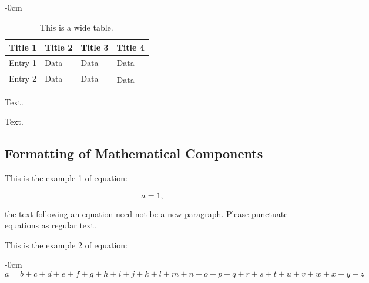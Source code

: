 \begin{table}[H]
	\caption{This is a wide table.\label{tab2}}
	\begin{adjustwidth}{-\extralength}{0cm}
		\begin{tabularx}{\fulllength}{CCCC}
			\toprule
			\textbf{Title 1} & \textbf{Title 2} & \textbf{Title 3} & \textbf{Title 4}         \\
			\midrule
			Entry 1          & Data             & Data             & Data                     \\
			Entry 2          & Data             & Data             & Data \textsuperscript{1} \\
			\bottomrule
		\end{tabularx}
	\end{adjustwidth}
\end{table}


Text.

Text.

\subsection{Formatting of Mathematical Components}

This is the example 1 of equation:
\begin{linenomath}
	\begin{equation}
		a = 1,
	\end{equation}
\end{linenomath}
the text following an equation need not be a new paragraph. Please punctuate equations as regular text.

This is the example 2 of equation:
\begin{adjustwidth}{-\extralength}{0cm}
	\begin{equation}
		a = b + c + d + e + f + g + h + i + j + k + l + m + n + o + p + q + r + s + t + u + v + w + x + y + z
	\end{equation}
\end{adjustwidth}

